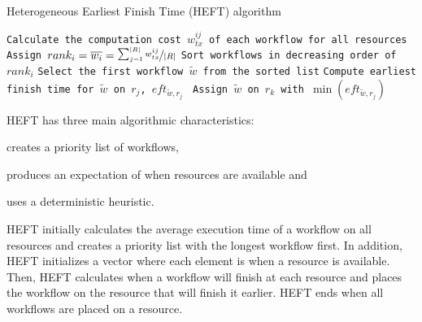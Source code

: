 \begin{algorithm}[t]
    \caption{Heterogeneous Earliest Finish Time (HEFT) algorithm}
    \label{alg:heft}
    \scriptsize
    \begin{algorithmic}[1]
        \State \texttt{Calculate the computation cost $w_{tx}^{ij}$ of each workflow for all resources}
        \State \texttt{Assign $rank_i = \overline{w_{i}} = \nicefrac{\sum_{j=1}^{|R|}w_{tx}^{ij}}{|R|}$}
        \State \texttt{Sort workflows in decreasing order of $rank_i$}
        \State \texttt{Select the first workflow $\tilde{w}$ from the sorted list}
        \State\texttt{Compute earliest finish time for $\tilde{w}$ on $r_{j}$, $eft_{\tilde{w},r_j}$ }
        \EndFor
        \State \texttt{Assign  $\tilde{w}$ on $r_k$ with $\min{(eft_{\tilde{w},r_j})}$}
        \EndWhile
        \EndProcedure
    \end{algorithmic}
\end{algorithm}

HEFT has three main algorithmic characteristics:
\begin{inparaenum}[1)]
    \item creates a priority list of workflows,
    \item produces an expectation of when resources are available and
    \item uses a deterministic heuristic.
\end{inparaenum}
HEFT initially calculates the average execution time of a workflow on all resources and creates a priority list with the longest workflow first.
In addition, HEFT initializes a vector where each element is when a resource is available.
Then, HEFT calculates when a workflow will finish at each resource and places the workflow on the resource that will finish it earlier.
HEFT ends when all workflows are placed on a resource.

   

